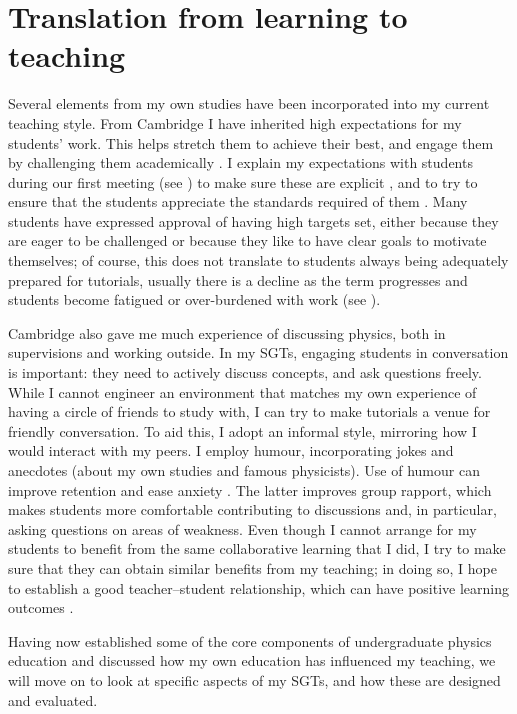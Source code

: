 \section{Translation from learning to teaching}

Several elements from my own studies have been incorporated into my current teaching style. From Cambridge I have inherited high expectations for my students' work. This helps stretch them to achieve their best, and engage them by challenging them academically \citep{Bamber2015}. I explain my expectations with students during our first meeting (see ) to make sure these are explicit \citep{Butcher2015}, and to try to ensure that the students appreciate the standards required of them \citep[chapter 8]{Ramsden1992}. Many students have expressed approval of having high targets set, either because they are eager to be challenged or because they like to have clear goals to motivate themselves; of course, this does not translate to students always being adequately prepared for tutorials, usually there is a decline as the term progresses and students become fatigued or over-burdened with work (see ).

Cambridge also gave me much experience of discussing physics, both in supervisions and working outside. In my SGTs, engaging students in conversation is important: they need to actively discuss concepts, and ask questions freely. While I cannot engineer an environment that matches my own experience of having a circle of friends to study with, I can try to make tutorials a venue for friendly conversation. To aid this, I adopt an informal style, mirroring how I would interact with my peers. I employ humour, incorporating jokes and anecdotes (about my own studies and famous physicists). Use of humour can improve retention and ease anxiety \citep[e.g.,][and references therein]{Korobkin1988,Lesser2008}. The latter improves group rapport, which makes students more comfortable contributing to discussions and, in particular, asking questions on areas of weakness. Even though I cannot arrange for my students to benefit from the same collaborative learning that I did, I try to make sure that they can obtain similar benefits from my teaching; in doing so, I hope to establish a good teacher--student relationship, which can have positive learning outcomes \citep{Cornelius-White2007}.

Having now established some of the core components of undergraduate physics education and discussed how my own education has influenced my teaching, we will move on to look at specific aspects of my SGTs, and how these are designed and evaluated.
